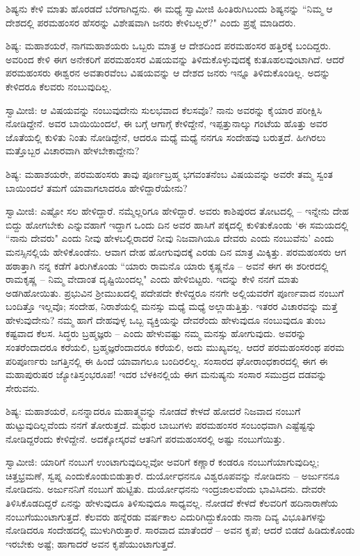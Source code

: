 ಶಿಷ್ಯನು ಕೇಳಿ ಮಾತು ಹೊರಡದೆ ಬೆರಗಾಗಿದ್ದನು. ಈ ಮಧ್ಯೆ ಸ್ವಾಮೀಜಿ ಹಿಂತಿರುಗಿಬಂದು ಶಿಷ್ಯನನ್ನು “ನಿಮ್ಮ ಆ ದೇಶದಲ್ಲಿ ಪರಮಹಂಸರ ಹೆಸರನ್ನು ವಿಶೇಷವಾಗಿ ಜನರು ಕೇಳಿಬಲ್ಲರೆ?" ಎಂದು ಪ್ರಶ್ನೆ ಮಾಡಿದರು.

ಶಿಷ್ಯ: ಮಹಾಶಯರೆ, ನಾಗಮಹಾಶಯರು ಒಬ್ಬರು ಮಾತ್ರ ಆ ದೇಶದಿಂದ ಪರಮಹಂಸರ ಹತ್ತಿರಕ್ಕೆ ಬಂದಿದ್ದರು. ಅವರಿಂದ ಕೇಳಿ ಈಗ ಅನೇಕರಿಗೆ ಪರಮಹಂಸರ ವಿಷಯವನ್ನು ತಿಳಿದುಕೊಳ್ಳುವುದಕ್ಕೆ ಕುತೂಹಲವುಂಟಾಗಿದೆ. ಆದರೆ ಪರಮಹಂಸರು ಈಶ್ವರನ ಅವತಾರವೆಂಬ ವಿಷಯವನ್ನು ಆ ದೇಶದ ಜನರು ಇನ್ನೂ ತಿಳಿದುಕೊಂಡಿಲ್ಲ. ಅದನ್ನು ಕೇಳಿದರೂ ಕೆಲವರು ನಂಬುವುದಿಲ್ಲ.

ಸ್ವಾಮೀಜಿ: ಆ ವಿಷಯವನ್ನು ನಂಬುವುದೇನು ಸುಲಭವಾದ ಕೆಲಸವೊ? ನಾನು ಅವರನ್ನು ಕೈಯಾರ ಪರೀಕ್ಷಿಸಿ ನೋಡಿದ್ದೇನೆ. ಅವರ ಬಾಯಿಯಿಂದಲೆ, ಈ ಬಗ್ಗೆ ಆಗಾಗ್ಗೆ ಕೇಳಿದ್ದೇನೆ, ಇಪ್ಪತ್ತುನಾಲ್ಕು ಗಂಟೆಯ ಹೊತ್ತು ಅವರ ಜೊತೆಯಲ್ಲಿ ಕುಳಿತು ನಿಂತು ನೋಡಿದ್ದೇನೆ, ಆದರೂ ಮಧ್ಯೆ ಮಧ್ಯೆ ನನಗೂ ಸಂದೇಹವು ಬರುತ್ತದೆ. ಹೀಗಿರಲು ಮತ್ತೊಬ್ಬರ ವಿಚಾರವಾಗಿ ಹೇಳಬೇಕಾದ್ದೇನು?

ಶಿಷ್ಯ: ಮಹಾಶಯರೇ, ಪರಮಹಂಸರು ತಾವು ಪೂರ್ಣಬ್ರಹ್ಮ ಭಗವಂತನೆಂಬ ವಿಷಯವನ್ನು ಅವರೇ ತಮ್ಮ ಸ್ವಂತ ಬಾಯಿಂದಲೆ ತಮಗೆ ಯಾವಾಗಲಾದರೂ ಹೇಳಿದ್ದಾರೆಯೇನು?

ಸ್ವಾಮೀಜಿ: ಎಷ್ಟೋ ಸಲ ಹೇಳಿದ್ದಾರೆ. ನಮ್ಮೆಲ್ಲರಿಗೂ ಹೇಳಿದ್ದಾರೆ. ಅವರು ಕಾಶಿಪುರದ ತೋಟದಲ್ಲಿ – ಇನ್ನೇನು ದೇಹ ಬಿದ್ದು ಹೋಗಬೇಕು ಎನ್ನುವಹಾಗೆ ಇದ್ದಾಗ ಒಂದು ದಿನ ಅವರ ಹಾಸಿಗೆ ಪಕ್ಕದಲ್ಲಿ ಕುಳಿತುಕೊಂಡು ‘ಈ ಸಮಯದಲ್ಲಿ “ನಾನು ದೇವರು" ಎಂದು ನೀವು ಹೇಳಬಲ್ಲಿರಾದರೆ ನೀವು ನಿಜವಾಗಿಯೂ ದೇವರು ಎಂದು ನಂಬುವೆನು’ ಎಂದು ಮನಸ್ಸಿನಲ್ಲಿಯೆ ಹೇಳಿಕೊಂಡೆನು. ಆವಾಗ ದೇಹ ಹೋಗುವುದಕ್ಕೆ ಎರಡು ದಿನ ಮಾತ್ರ ಮಿಕ್ಕಿತ್ತು. ಪರಮಹಂಸರು ಆಗ ಹಠಾತ್ತಾಗಿ ನನ್ನ ಕಡೆಗೆ ತಿರುಗಿಕೊಂಡು “ಯಾರು ರಾಮನೊ ಯಾರು ಕೃಷ್ಣನೊ – ಅವನೆ ಈಗ ಈ ಶರೀರದಲ್ಲಿ ರಾಮಕೃಷ್ಣ – ನಿಮ್ಮ ವೇದಾಂತ ದೃಷ್ಟಿಯಿಂದಲ್ಲ" ಎಂದು ಹೇಳಿಬಿಟ್ಟರು. ಇದನ್ನು ಕೇಳಿ ನನಗೆ ಮಾತು ಅಡಗಿಹೋಯಿತು. ಪ್ರಭುವಿನ ಶ‍್ರೀಮುಖದಲ್ಲಿ ಪದೇಪದೇ ಕೇಳಿದ್ದರೂ ನನಗೇ ಅಲ್ಲಿಯವರೆಗೆ ಪೂರ್ಣವಾದ ನಂಬುಗೆ ಬಂದಿತ್ತೊ ಇಲ್ಲವೊ; ಸಂದೇಹ, ನಿರಾಶೆಯಲ್ಲಿ ಮನಸ್ಸು ಮಧ್ಯೆ ಮಧ್ಯೆ ಅಲ್ಲಾಡುತ್ತಿತ್ತು. ಇತರರ ವಿಚಾರವನ್ನು ಮತ್ತೆ ಹೇಳುವುದೇನು? ನಮ್ಮ ಹಾಗೆ ದೇಹವುಳ್ಳ ಒಬ್ಬ ವ್ಯಕ್ತಿಯನ್ನು ದೇವರೆಂದು ಹೇಳುವುದೂ ನಂಬುವುದೂ ತುಂಬ ಕಷ್ಟವಾದ ಕೆಲಸ. ಸಿದ್ಧರು ಬ್ರಹ್ಮಜ್ಞರು – ಎಂದು ಹೇಳುವಷ್ಟು ನಮ್ಮ ಮನಸ್ಸು ಹೋಗುವುದು. ಅವರನ್ನು ಸಂತರೆಂದಾದರೂ ಕರೆಯಲಿ, ಬ್ರಹ್ಮಜ್ಞರೆಂದಾದರೂ ಕರೆಯಲಿ, ಅದು ಮುಖ್ಯವಲ್ಲ. ಆದರೆ ಪರಮಹಂಸರಂಥ ಪರಮ ಪರಿಪೂರ್ಣರು ಜಗತ್ತಿನಲ್ಲಿ ಈ ಹಿಂದೆ ಯಾವಾಗಲೂ ಬಂದಿರಲಿಲ್ಲ. ಸಂಸಾರದ ಘೋರಾಂಧಕಾರದಲ್ಲಿ ಈಗ ಈ ಮಹಾಪುರುಷರ ಜ್ಯೋತಿಸ್ತಂಭರೂಪ! ಇದರ ಬೆಳಕಿನಲ್ಲಿಯೆ ಈಗ ಮನುಷ್ಯನು ಸಂಸಾರ ಸಮುದ್ರದ ದಡವನ್ನು ಸೇರುವನು.

ಶಿಷ್ಯ: ಮಹಾಶಯರೆ, ಏನನ್ನಾದರೂ ಮಹಾತ್ಮ್ಯವನ್ನು ನೋಡದೆ ಕೇಳದೆ ಹೋದರೆ ನಿಜವಾದ ನಂಬುಗೆ ಹುಟ್ಟುವುದಿಲ್ಲವೆಂದು ನನಗೆ ತೋರುತ್ತದೆ. ಮಥುರ ಬಾಬುಗಳು ಪರಮಹಂಸರ ಸಂಬಂಧವಾಗಿ ಎಷ್ಟೆಷ್ಟನ್ನು ನೋಡಿದ್ದರೆಂದು ಕೇಳಿದ್ದೇನೆ. ಅದಕ್ಕೋಸ್ಕರವೆ ಆತನಿಗೆ ಪರಮಹಂಸರಲ್ಲಿ ಅಷ್ಟು ನಂಬುಗೆಯಿತ್ತು.

ಸ್ವಾಮೀಜಿ: ಯಾರಿಗೆ ನಂಬುಗೆ ಉಂಟಾಗುವುದಿಲ್ಲವೋ ಅವರಿಗೆ ಕಣ್ಣಾರೆ ಕಂಡರೂ ನಂಬುಗೆಯಾಗುವುದಿಲ್ಲ; ಚಿತ್ತಭ್ರಮಣೆ, ಸ್ವಪ್ನ ಎಂದುಕೊಂಡುಬಿಡುತ್ತಾರೆ. ದುರ್ಯೋಧನನೂ ವಿಶ್ವರೂಪವನ್ನು ನೋಡಿದನು – ಅರ್ಜುನನೂ ನೋಡಿದನು. ಅರ್ಜುನನಿಗೆ ನಂಬುಗೆ ಹುಟ್ಟಿತು. ದುರ್ಯೋಧನನು ಇಂದ್ರಜಾಲವೆಂದು ಭಾವಿಸಿದನು. ದೇವರೇ ತಿಳಿಸಿಕೊಡದಿದ್ದರೆ ಏನನ್ನು ಹೇಳುವುದೂ ತಿಳಿಸುವುದೂ ಸಾಧ್ಯವಲ್ಲ. ನೋಡದೆ ಕೇಳದೆ ಕೆಲವರಿಗೆ ಹದಿನಾರಾಣೆಯ ನಂಬುಗೆಯುಂಟಾಗುತ್ತದೆ. ಕೆಲವರು ಹನ್ನೆರಡು ವರ್ಷಕಾಲ ಎದುರಿಗಿದ್ದುಕೊಂಡು ನಾನಾ ದಿವ್ಯ ವಿಭೂತಿಗಳನ್ನು ನೋಡಿದರೂ ಸಂದೇಹದಲ್ಲಿ ಮುಳುಗಿರುತ್ತಾರೆ. ಸಾರವಾದ ಮಾತೆಂದರೆ – ಅವನ ಕೃಪೆ; ಆದರೆ ಬಿಡದೆ ಹಿಡಿದುಕೊಂಡು ಇರಬೇಕು ಅಷ್ಟೆ; ಹಾಗಾದರೆ ಅವನ ಕೃಪೆಯುಂಟಾಗುತ್ತದೆ.


